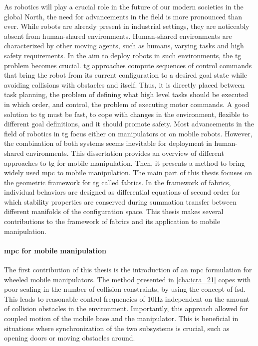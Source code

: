 
As robotics will play a crucial role in the future of our
modern societies in the global North, the need for
advancements in the field is more pronounced than ever.
While robots are already present in industrial settings,
they are noticeably absent from human-shared environments.
Human-shared environments are characterized by other moving agents, 
such as humans, varying tasks and high safety requirements.
In the aim to deploy robots in such environments, the
\ac{tg} problem becomes crucial. \Ac{tg} approaches compute sequences
of control commands that bring the robot from its current
configuration to a desired goal state while avoiding
collisions with obstacles and itself. Thus, it is directly placed between 
task planning, the problem of defining what high level tasks should be executed
in which order, and control, the problem of executing motor commands.
A good solution to \ac{tg} must be fast, to cope with changes in the
environment, flexible to different goal definitions, and it should promote safety.
Most advancements in the field of robotics in \ac{tg} focus either on
manipulators or on mobile robots. However, the combination of both
systems seems inevitable for deployment in human-shared environments.
This dissertation provides an overview of different approaches to \ac{tg} for
mobile manipulation. Then, it presents a method to bring widely used \ac{mpc}
to mobile manipulation. The main part of this thesis focuses on the geometric
framework for \ac{tg} called \ac{fabrics}. In the framework of \ac{fabrics},
individual behaviors are designed as differential equations of second order
for which stability properties are conserved during summation transfer between
different manifolds of the configuration space. This thesis makes several
contributions to the framework of \ac{fabrics} and its application to mobile
manipulation.

\paragraph{\acf{mpc} for mobile manipulation}
The first contribution of this thesis is the introduction of an \ac{mpc}
formulation for wheeled mobile manipulators. The method presented in \cref{cha:icra_21}
copes with poor scaling in the number of collision constraints, by using the
concept of \ac{fsd}. This leads to reasonable control frequencies of 10Hz
independent on the amount of collision obstacles in the environment.
Importantly, this approach allowed for coupled motion of the mobile base and the
manipulator. This is beneficial in situations where synchronization of the two
subsystems is crucial, such as opening doors or moving obstacles around.

